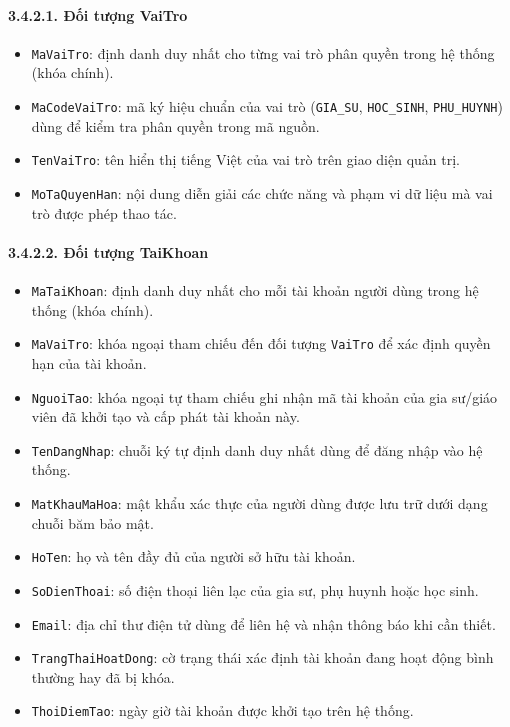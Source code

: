 \paragraph{3.4.2.1. Đối tượng VaiTro}\mbox{}
\begin{itemize}\setlength{\itemsep}{2pt}\setlength{\parskip}{0pt}
    \item \texttt{MaVaiTro}: định danh duy nhất cho từng vai trò phân quyền trong hệ thống (khóa chính).
    \item \texttt{MaCodeVaiTro}: mã ký hiệu chuẩn của vai trò (\texttt{GIA\_SU}, \texttt{HOC\_SINH}, \texttt{PHU\_HUYNH}) dùng để kiểm tra phân quyền trong mã nguồn.
    \item \texttt{TenVaiTro}: tên hiển thị tiếng Việt của vai trò trên giao diện quản trị.
    \item \texttt{MoTaQuyenHan}: nội dung diễn giải các chức năng và phạm vi dữ liệu mà vai trò được phép thao tác.
\end{itemize}

\paragraph{3.4.2.2. Đối tượng TaiKhoan}\mbox{}
\begin{itemize}\setlength{\itemsep}{2pt}\setlength{\parskip}{0pt}
    \item \texttt{MaTaiKhoan}: định danh duy nhất cho mỗi tài khoản người dùng trong hệ thống (khóa chính).
    \item \texttt{MaVaiTro}: khóa ngoại tham chiếu đến đối tượng \texttt{VaiTro} để xác định quyền hạn của tài khoản.
    \item \texttt{NguoiTao}: khóa ngoại tự tham chiếu ghi nhận mã tài khoản của gia sư/giáo viên đã khởi tạo và cấp phát tài khoản này.
    \item \texttt{TenDangNhap}: chuỗi ký tự định danh duy nhất dùng để đăng nhập vào hệ thống.
    \item \texttt{MatKhauMaHoa}: mật khẩu xác thực của người dùng được lưu trữ dưới dạng chuỗi băm bảo mật.
    \item \texttt{HoTen}: họ và tên đầy đủ của người sở hữu tài khoản.
    \item \texttt{SoDienThoai}: số điện thoại liên lạc của gia sư, phụ huynh hoặc học sinh.
    \item \texttt{Email}: địa chỉ thư điện tử dùng để liên hệ và nhận thông báo khi cần thiết.
    \item \texttt{TrangThaiHoatDong}: cờ trạng thái xác định tài khoản đang hoạt động bình thường hay đã bị khóa.
    \item \texttt{ThoiDiemTao}: ngày giờ tài khoản được khởi tạo trên hệ thống.
\end{itemize}

